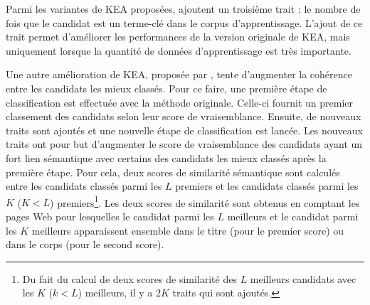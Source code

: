           Parmi les variantes de KEA proposées, \citet{frank1999keafrequency}
          ajoutent un troisième trait : le nombre de fois que le candidat est un
          terme-clé dans le corpus d'apprentissage. L'ajout de ce trait permet
          d'améliorer les performances de la version originale de KEA, mais
          uniquement lorsque la quantité de données d'apprentissage est très
          importante.
          
          Une autre amélioration de KEA, proposée par
          \citet{turney2003keacoherence}, tente d'augmenter la cohérence entre
          les candidats les mieux classés. Pour ce faire, une première étape de
          classification est effectuée avec la méthode originale. Celle-ci
          fournit un premier classement des candidats selon leur score de
          vraisemblance. Ensuite, de nouveaux traits sont ajoutés et une
          nouvelle étape de classification est lancée. Les nouveaux traits ont
          pour but d'augmenter le score de vraisemblance des candidats ayant un
          fort lien sémantique avec certains des candidats les mieux classés
          après la première étape. Pour cela, deux scores de similarité
          sémantique sont calculés entre les candidats classés parmi les $L$
          premiers et les candidats classés parmi les $K$ ($K < L$)
          premiers\footnote{Du fait du calcul de deux scores de similarité des
          $L$ meilleurs candidats avec les $K$ ($k < L$) meilleurs, il y a $2K$
          traits qui sont ajoutés.}. Les deux scores de similarité sont obtenus
          en comptant les pages Web pour lesquelles le candidat parmi les $L$
          meilleurs et le candidat parmi les $K$ meilleurs apparaissent ensemble
          dans le titre (pour le premier score) ou dans le corps (pour le second
          score).

